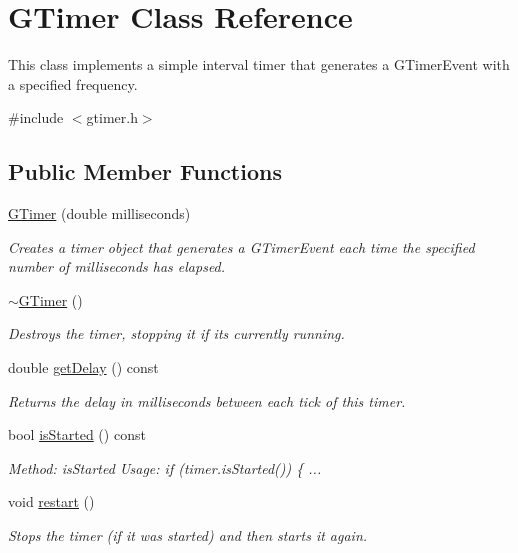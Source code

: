\hypertarget{classGTimer}{}\section{G\+Timer Class Reference}
\label{classGTimer}


This class implements a simple interval timer that generates a {\ttfamily G\+Timer\+Event} with a specified frequency.  




{\ttfamily \#include $<$gtimer.\+h$>$}

\subsection*{Public Member Functions}
\begin{DoxyCompactItemize}
\item 
\mbox{\hyperlink{classGTimer_ab947e096ce76b63f283502e4b4446810}{G\+Timer}} (double milliseconds)
\begin{DoxyCompactList}\small\item\em Creates a timer object that generates a {\ttfamily G\+Timer\+Event} each time the specified number of milliseconds has elapsed. \end{DoxyCompactList}\item 
\mbox{\hyperlink{classGTimer_a2f693771957cae3efd9bfc952c543961}{$\sim$\+G\+Timer}} ()
\begin{DoxyCompactList}\small\item\em Destroys the timer, stopping it if it\textquotesingle{}s currently running. \end{DoxyCompactList}\item 
double \mbox{\hyperlink{classGTimer_a73d6fbcedb3f4c8379a76161503dc8f8}{get\+Delay}} () const
\begin{DoxyCompactList}\small\item\em Returns the delay in milliseconds between each tick of this timer. \end{DoxyCompactList}\item 
bool \mbox{\hyperlink{classGTimer_ac1991ea0e286fbb461b60c8c9299d781}{is\+Started}} () const
\begin{DoxyCompactList}\small\item\em Method\+: is\+Started Usage\+: if (timer.\+is\+Started()) \{ ... \end{DoxyCompactList}\item 
void \mbox{\hyperlink{classGTimer_a22ee094ca3f45aa4156b97d34fe678bf}{restart}} ()
\begin{DoxyCompactList}\small\item\em Stops the timer (if it was started) and then starts it again. \end{DoxyCompactList}\item 

\end{DoxyCompactItemize}
